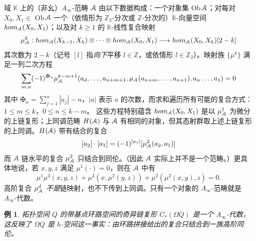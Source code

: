 \documentclass[11pt,a4paper]{article}
\numberwithin{equation}{section}
\newtheorem{Example}[thm]{例}
\newcommand{\bZ}{\mathbb{Z}}
\newcommand{\bK}{\mathbb{K}}
\newcommand{\scrA}{\EuScript{A}}
\begin{document}
域 $\bK$ 上的（非幺）$A_{\infty}$-范畴 $\scrA$ 由以下数据构成：一个对象集 Ob$\,\scrA$；对每对 $X_0, X_1 \in$ Ob$\,\scrA$ 一个（依情形为 $\bZ_2$-分次或 $\bZ$-分次的）$\bK$-向量空间 $hom_{\scrA}(X_0, X_1)$；以及对 $k \geq 1$ 的 $\bK$-线性复合映射
\[
\mu_{\scrA}^k: hom_{\scrA}(X_{k-1},X_k) \otimes \cdots \otimes hom_{\scrA}(X_0,X_1) \longrightarrow hom_{\scrA}(X_0,X_k)[2-k]
\]
其次数为 $2-k$（记号 $[l]$ 指\emph{向下}平移 $l \in \bZ$，或依情形 $l\in \bZ_2$）。映射族 $\{\mu^k\}$ 满足一列二次方程
\[
\sum_{m,n} (-1)^{\maltese_n} \mu_{\scrA}^{k-m+1} (a_d,\ldots,a_{n+m+1}, \mu_{\scrA}(a_{n+m},\ldots,a_{n+1}),a_n \ldots, a_1) = 0
\]
其中 $\maltese_n = \sum_{j=1}^n |a_j|-n$，$|a|$ 表示 $a$ 的次数，而求和遍历所有可能的复合方式：$1 \leq m \leq k$，$0\leq n \leq k-m$。
这些方程特别蕴含 $hom_{\scrA}(X_0,X_1)$ 是以 $\mu^1_{\scrA}$ 为微分的上链复形；上同调范畴 $H(\scrA)$ 与 $\scrA$ 有相同的对象，但其态射群取上述上链复形的上同调。$H(\scrA)$ 带有结合的复合
\[
[a_2]\cdot[a_1] = (-1)^{|a_1|}[\mu_{\scrA}^2(a_2,a_1)]
\]
而 $\scrA$ 链水平的复合 $\mu_{\scrA}^2$ 只结合到同伦。（因此 $\scrA$ 实际上并不是一个范畴。）更具体地说，若 $x,y,z$ 满足 $\mu^1(\cdot) = 0$，则在 $\scrA$ 中有
\[
\mu^1\mu^3(x,y,z) + \mu^2(x,\mu^2(y,z)) + \mu^2(\mu^2(x,y),z) = 0.\]
高阶复合 $\mu_{\scrA}^d$ \emph{不是}链映射，也不下传到上同调。只有一个对象的 $A_{\infty}$-范畴就是 $A_{\infty}$-代数。

\begin{Example}
拓扑空间 $Q$ 的带基点环路空间的奇异链复形 $C_*(\Omega Q)$ 是一个 $A_{\infty}$-代数，这反映了 $\Omega Q$ 是 $h$-空间这一事实：由环路拼接给出的复合只结合到一族高阶同伦。
\end{Example}
\end{document}
